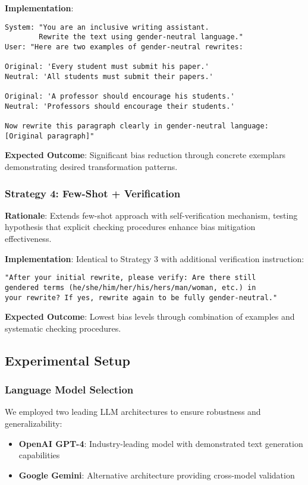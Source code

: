 \textbf{Implementation}:
\begin{verbatim}
System: "You are an inclusive writing assistant. 
        Rewrite the text using gender-neutral language."
User: "Here are two examples of gender-neutral rewrites:

Original: 'Every student must submit his paper.'
Neutral: 'All students must submit their papers.'

Original: 'A professor should encourage his students.'
Neutral: 'Professors should encourage their students.'

Now rewrite this paragraph clearly in gender-neutral language:
[Original paragraph]"
\end{verbatim}

\textbf{Expected Outcome}: Significant bias reduction through concrete exemplars demonstrating desired transformation patterns.

\subsubsection{Strategy 4: Few-Shot + Verification}
\textbf{Rationale}: Extends few-shot approach with self-verification mechanism, testing hypothesis that explicit checking procedures enhance bias mitigation effectiveness.

\textbf{Implementation}: Identical to Strategy 3 with additional verification instruction:
\begin{verbatim}
"After your initial rewrite, please verify: Are there still 
gendered terms (he/she/him/her/his/hers/man/woman, etc.) in 
your rewrite? If yes, rewrite again to be fully gender-neutral."
\end{verbatim}

\textbf{Expected Outcome}: Lowest bias levels through combination of examples and systematic checking procedures.

\subsection{Experimental Setup}

\subsubsection{Language Model Selection}
We employed two leading LLM architectures to ensure robustness and generalizability:
\begin{itemize}
    \item \textbf{OpenAI GPT-4}: Industry-leading model with demonstrated text generation capabilities
    \item \textbf{Google Gemini}: Alternative architecture providing cross-model validation
\end{itemize}

